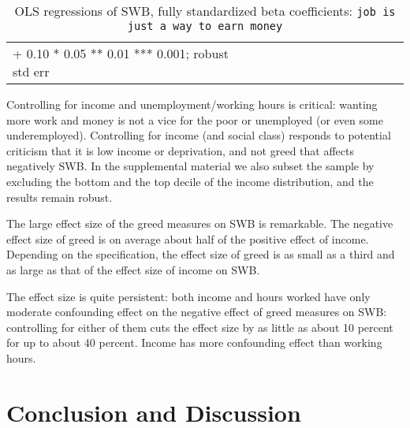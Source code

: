 \documentclass[10pt, letterpaper]{article}
\begin{document}
\begin{spacing}{1.8}
\begin{spacing}{.9} \begin{table}[H]\centering   \begin{scriptsize} \begin{tabular}{p{1.8in}p{.5in}p{.5in}p{.5in}p{.5in}p{.5in}p{.5in}p{.5in}p{.5in}p{.5in}p{.5 in}p{.5in}p{.5 in}}\hline  \hline + 0.10 * 0.05 ** 0.01 *** 0.001; robust std err \end{tabular}\end{scriptsize}\caption{\label{betad}OLS regressions of SWB, fully standardized beta coefficients: \texttt{job is just a way to earn money}}\end{table} \end{spacing}


Controlling for income and unemployment/working hours is critical: wanting more work and money is not a vice for the poor or unemployed (or even some underemployed). 
Controlling for income (and social class) responds to potential criticism  that it is low
income or deprivation, and not greed that affects negatively SWB. In the supplemental material we also subset the sample by excluding the bottom and the top decile of the income distribution, and the results remain robust.  

The large effect size of the greed measures on SWB is remarkable. The negative effect size of greed is on average about half of the positive effect of income.
Depending on the specification, the effect size of greed is as small as a third and
as large as that of the effect size of income on SWB.

The effect size is quite persistent: both income and  hours worked have only moderate confounding effect on the negative effect of greed measures on SWB:
controlling for either of them cuts the effect size by as little as about 10 percent for up to about 40 percent. Income has more confounding effect than working hours. 

\section{Conclusion and Discussion}

\end{spacing}
\end{document}
